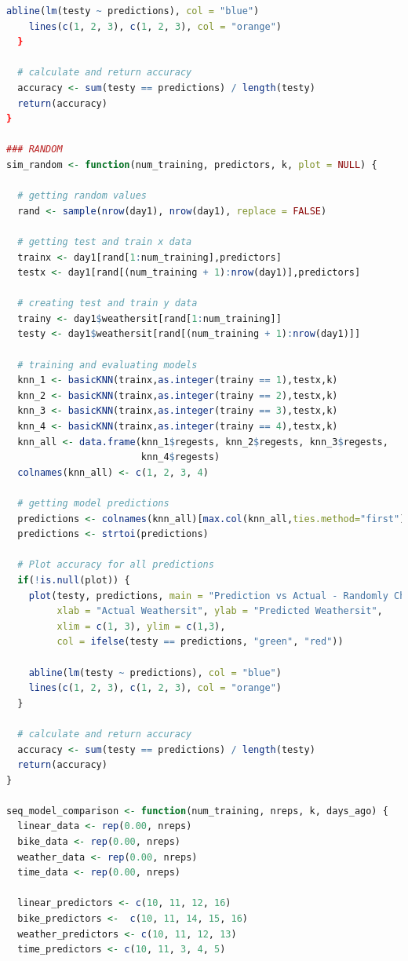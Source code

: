 \documentclass[12pt]{article}
\begin{document}
\begin{lstlisting}[language=R]
    abline(lm(testy ~ predictions), col = "blue")
    lines(c(1, 2, 3), c(1, 2, 3), col = "orange")
  }

  # calculate and return accuracy
  accuracy <- sum(testy == predictions) / length(testy)
  return(accuracy)
}

### RANDOM
sim_random <- function(num_training, predictors, k, plot = NULL) {
  
  # getting random values
  rand <- sample(nrow(day1), nrow(day1), replace = FALSE)
  
  # getting test and train x data
  trainx <- day1[rand[1:num_training],predictors]
  testx <- day1[rand[(num_training + 1):nrow(day1)],predictors]
  
  # creating test and train y data
  trainy <- day1$weathersit[rand[1:num_training]]
  testy <- day1$weathersit[rand[(num_training + 1):nrow(day1)]]
  
  # training and evaluating models
  knn_1 <- basicKNN(trainx,as.integer(trainy == 1),testx,k)
  knn_2 <- basicKNN(trainx,as.integer(trainy == 2),testx,k)
  knn_3 <- basicKNN(trainx,as.integer(trainy == 3),testx,k)
  knn_4 <- basicKNN(trainx,as.integer(trainy == 4),testx,k)
  knn_all <- data.frame(knn_1$regests, knn_2$regests, knn_3$regests, 
                        knn_4$regests)
  colnames(knn_all) <- c(1, 2, 3, 4)
  
  # getting model predictions
  predictions <- colnames(knn_all)[max.col(knn_all,ties.method="first")]
  predictions <- strtoi(predictions)
  
  # Plot accuracy for all predictions
  if(!is.null(plot)) {
    plot(testy, predictions, main = "Prediction vs Actual - Randomly Chosen Data", 
         xlab = "Actual Weathersit", ylab = "Predicted Weathersit",
         xlim = c(1, 3), ylim = c(1,3), 
         col = ifelse(testy == predictions, "green", "red"))
    
    abline(lm(testy ~ predictions), col = "blue")
    lines(c(1, 2, 3), c(1, 2, 3), col = "orange")
  }
  
  # calculate and return accuracy
  accuracy <- sum(testy == predictions) / length(testy)
  return(accuracy)
}

seq_model_comparison <- function(num_training, nreps, k, days_ago) {
  linear_data <- rep(0.00, nreps)
  bike_data <- rep(0.00, nreps)
  weather_data <- rep(0.00, nreps)
  time_data <- rep(0.00, nreps)
  
  linear_predictors <- c(10, 11, 12, 16)
  bike_predictors <-  c(10, 11, 14, 15, 16)
  weather_predictors <- c(10, 11, 12, 13)
  time_predictors <- c(10, 11, 3, 4, 5)
  

\end{lstlisting}
\end{document}
